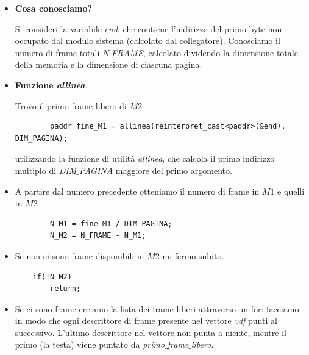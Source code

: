 \documentclass[11pt]{report}
\theoremstyle{definition}
\begin{document}
\begin{itemize}
	\item \textbf{Cosa conosciamo?} 
	
	Si consideri la variabile \emph{end}, che contiene l'indirizzo del primo byte non occupato dal modulo sistema (calcolato dal collegatore). Conosciamo il numero di frame totali \emph{N$\_$FRAME}, calcolato dividendo la dimensione totale della memoria e la dimensione di ciascuna pagina.
	\item \textbf{Funzione \emph{allinea}}.
	
	Trovo il primo frame libero di $M2$ 
	\begin{verbatim}
		paddr fine_M1 = allinea(reinterpret_cast<paddr>(&end), DIM_PAGINA);
	\end{verbatim}
	utilizzando la funzione di utilità \emph{allinea}, che calcola il primo indirizzo multiplo di \emph{DIM$\_$PAGINA}  maggiore del primo argomento.
	\item A partire dal numero precedente otteniamo il numero di frame in $M1$ e quelli in $M2$
	\begin{verbatim}
		N_M1 = fine_M1 / DIM_PAGINA;
		N_M2 = N_FRAME - N_M1;
	\end{verbatim}
	\item Se non ci sono frame disponibili in $M2$ mi fermo subito.
	\begin{verbatim}
	if(!N_M2)
	    return;
	\end{verbatim}
	\item Se ci sono frame creiamo la lista dei frame liberi attraverso un for: facciamo in modo che ogni descrittore di frame presente nel vettore \emph{vdf} punti al successivo. L'ultimo descrittore nel vettore non punta a niente, mentre il primo (la testa) viene puntato da \emph{primo$\_$frame$\_$libero}.
\end{itemize}
\end{document}
